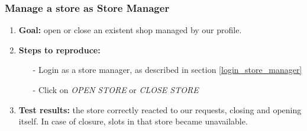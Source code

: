 \documentclass[table, 12pt]{article}
\begin{document}
\subsubsection{Manage a store as Store Manager}
\begin{enumerate}[i]
    \item \textbf{Goal:} open or close an existent shop managed by our profile.
    \item \textbf{Steps to reproduce:}
          \begin{itemize}
              \item[-] Login as a store manager, as described in section \ref{login_store_manager}
              \item[-] Click on \textit{OPEN STORE} or \textit{CLOSE STORE}
          \end{itemize}
    \item \textbf{Test results:} the store correctly reacted to our requests, closing and opening itself. In case of closure, slots in that store became unavailable.
\end{enumerate}
\end{document}
